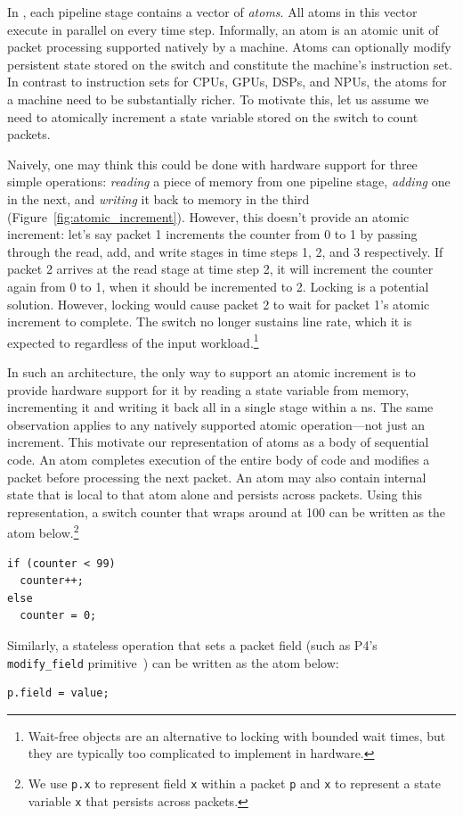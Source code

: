 In \absmachine, each pipeline stage contains a vector of \textit{atoms}. All
atoms in this vector execute in parallel on every time step.  Informally, an
atom is an atomic unit of packet processing supported natively by a \absmachine
machine. Atoms can optionally modify persistent state stored on the switch
and constitute the machine's instruction set.  In contrast to instruction sets for
CPUs, GPUs, DSPs, and NPUs, the atoms for a \absmachine machine need to be
substantially richer. To motivate this, let us assume we need to atomically
increment a state variable stored on the switch to count packets.

Naively, one may think this could be done with hardware support for three
simple operations: \textit{reading} a piece of memory from one pipeline stage,
\textit{adding} one in the next, and \textit{writing} it back to memory in the
third (Figure~\ref{fig:atomic_increment}). However, this doesn't provide an
atomic increment: let's say packet 1 increments the counter from 0 to 1 by
passing through the read, add, and write stages in time steps 1, 2, and 3
respectively.  If packet 2 arrives at the read stage at time step 2, it will
increment the counter again from 0 to 1, when it should be incremented to 2.
Locking is a potential solution. However, locking would cause packet 2 to wait
for packet 1's atomic increment to complete. The switch no longer sustains line
rate, which it is expected to regardless of the input
workload.\footnote{Wait-free objects are an alternative to locking with bounded
  wait times, but they are typically too complicated to implement in hardware.}

In such an architecture, the only way to support an atomic increment is to
provide hardware support for it by reading a state variable from memory,
incrementing it and writing it back all in a single stage within a ns. The same
observation applies to any natively supported atomic operation---not just an
increment. This motivate our representation of atoms as a body of sequential
code. An atom completes execution of the entire body of code and modifies a
packet before processing the next packet.  An atom may also contain internal
state that is local to that atom alone and persists across packets.  Using this
representation, a switch counter that wraps around at 100 can be written as the
atom below.\footnote{We use {\tt p.x} to represent field {\tt x} within a
  packet {\tt p} and {\tt x} to represent a state variable {\tt x} that
persists across packets.}
\begin{lstlisting}[style=customc, numbers=none, frame=none]
if (counter < 99)
  counter++;
else
  counter = 0;
\end{lstlisting}
Similarly, a stateless operation that sets a packet field (such as P4's {\tt
modify\_field} primitive~\cite{p4spec}) can be written as the atom below:
\begin{lstlisting}[style=customc, numbers=none, frame=none]
  p.field = value;
\end{lstlisting}

